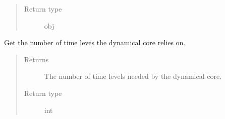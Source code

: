 \documentclass[letterpaper,10pt,english]{sphinxmanual}
\begin{document}
\begin{fulllineitems}
\begin{fulllineitems}
\begin{quote}
\begin{description}
\item[{Return type}] \leavevmode
obj

\end{description}\end{quote}

\end{fulllineitems}


\begin{fulllineitems}
\label{\detokenize{api:tasmania.dycore.dycore_isentropic.DynamicalCoreIsentropic.time_levels}}
Get the number of time leves the dynamical core relies on.
\begin{quote}\begin{description}
\item[{Returns}] \leavevmode
The number of time levels needed by the dynamical core.

\item[{Return type}] \leavevmode
int

\end{description}\end{quote}

\end{fulllineitems}


\end{fulllineitems}

\end{document}
